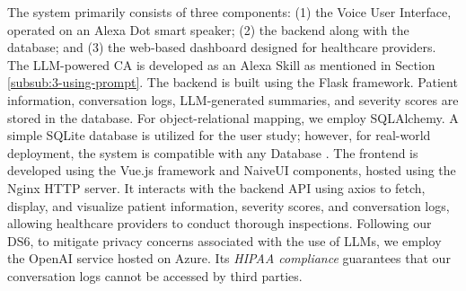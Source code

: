 The system primarily consists of three components: (1) the Voice User Interface, operated on an Alexa Dot smart speaker; (2) the backend along with the database; and (3) the web-based dashboard designed for healthcare providers.
The LLM-powered CA is developed as an Alexa Skill as mentioned in Section \ref{subsub:3-using-prompt}.
The backend is built using the Flask framework. Patient information, conversation logs, LLM-generated summaries, and severity scores are stored in the database. For object-relational mapping, we employ SQLAlchemy. A simple SQLite database is utilized for the user study; however, for real-world deployment, the system is compatible with any Database .
The frontend is developed using the Vue.js framework and NaiveUI components, hosted using the Nginx HTTP server. It interacts with the backend API using axios to fetch, display, and visualize patient information, severity scores, and conversation logs, allowing healthcare providers to conduct thorough inspections.
Following our DS6, to mitigate privacy concerns associated with the use of LLMs, we employ the OpenAI service hosted on Azure. Its \textit{HIPAA compliance} guarantees that our conversation logs cannot be accessed by third parties.


